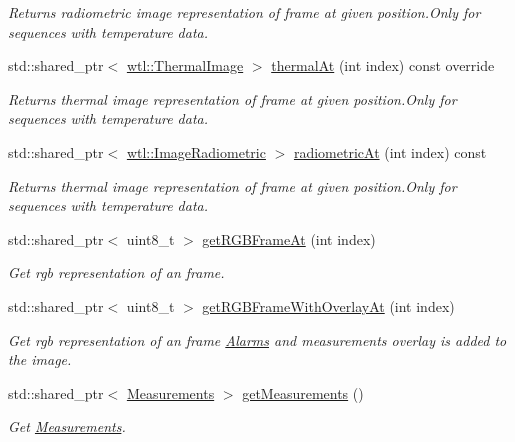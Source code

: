 \begin{DoxyCompactItemize}
\begin{DoxyCompactList}\small\item\em Returns radiometric image representation of frame at given position.\+Only for sequences with temperature data. \end{DoxyCompactList}\item 
std\+::shared\+\_\+ptr$<$ \hyperlink{classwtl_1_1_thermal_image}{wtl\+::\+Thermal\+Image} $>$ \hyperlink{classwtl_1_1_sequence_radiometric_ae7b8f68b95bdda29cd202570c4fb9fbd}{thermal\+At} (int index) const override
\begin{DoxyCompactList}\small\item\em Returns thermal image representation of frame at given position.\+Only for sequences with temperature data. \end{DoxyCompactList}\item 
std\+::shared\+\_\+ptr$<$ \hyperlink{classwtl_1_1_image_radiometric}{wtl\+::\+Image\+Radiometric} $>$ \hyperlink{classwtl_1_1_sequence_radiometric_a3b465540b5cbc1a7f0dfd1f6d91aa7d1}{radiometric\+At} (int index) const
\begin{DoxyCompactList}\small\item\em Returns thermal image representation of frame at given position.\+Only for sequences with temperature data. \end{DoxyCompactList}\item 
std\+::shared\+\_\+ptr$<$ uint8\+\_\+t $>$ \hyperlink{classwtl_1_1_sequence_radiometric_af0503fb4a89d9a356a4a68bad6da976d}{get\+R\+G\+B\+Frame\+At} (int index)
\begin{DoxyCompactList}\small\item\em Get rgb representation of an frame. \end{DoxyCompactList}\item 
std\+::shared\+\_\+ptr$<$ uint8\+\_\+t $>$ \hyperlink{classwtl_1_1_sequence_radiometric_a04ca24ba12175157835a6f2cb8495971}{get\+R\+G\+B\+Frame\+With\+Overlay\+At} (int index)
\begin{DoxyCompactList}\small\item\em Get rgb representation of an frame \hyperlink{classwtl_1_1_alarms}{Alarms} and measurements overlay is added to the image. \end{DoxyCompactList}\item 
std\+::shared\+\_\+ptr$<$ \hyperlink{classwtl_1_1_measurements}{Measurements} $>$ \hyperlink{classwtl_1_1_sequence_radiometric_a4084caa5e30330375300173b4b0582d0}{get\+Measurements} ()
\begin{DoxyCompactList}\small\item\em Get \hyperlink{classwtl_1_1_measurements}{Measurements}. \end{DoxyCompactList}\item 

\end{DoxyCompactItemize}
